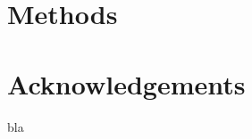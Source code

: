 \documentclass[12pt,english]{article}
\begin{document}
\begin{bibunit}
\begin{small}
\section*{\normalsize Methods}\label{sec:methods} %


\section*{\normalsize Acknowledgements}
bla



\end{small}
\end{bibunit}
\end{document}
